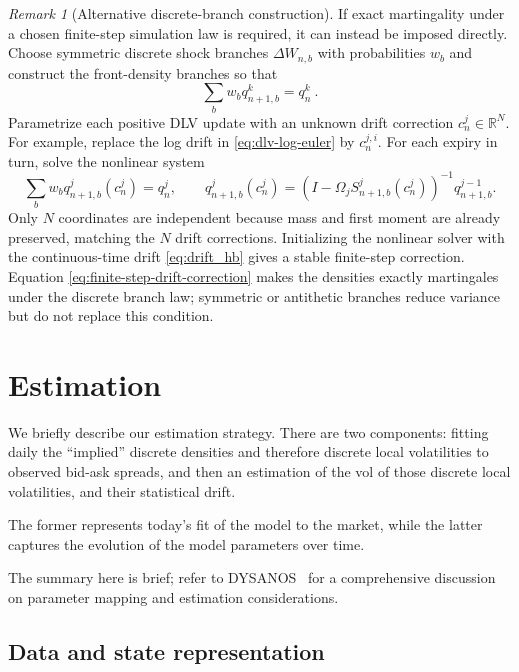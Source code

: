 \documentclass[11pt]{article}
\theoremstyle{plain}
\theoremstyle{definition}
\theoremstyle{remark}
\newtheorem{remark}[theorem]{Remark}
\begin{document}
\begin{remark}[Alternative discrete-branch construction]
  \label{rem:discrete-branch-sampling}
  If exact martingality under a chosen finite-step simulation law is required,
  it can instead be imposed directly. Choose symmetric discrete shock branches
  $\Delta W_{n,b}$ with probabilities $w_b$ and construct the front-density
  branches so that
  \[
    \sum_b w_bq_{n+1,b}^k=q_n^k \ .
  \]
  Parametrize each positive DLV update with an unknown drift correction
  $c_n^j\in\mathbb R^N$. For example, replace the log drift in
  \eqref{eq:dlv-log-euler} by $c_n^{j,i}$. For each expiry in turn, solve the
  nonlinear system
  \begin{equation}
    \label{eq:finite-step-drift-correction}
    \sum_b w_b q_{n+1,b}^j(c_n^j)=q_n^j,
    \qquad
    q_{n+1,b}^j(c_n^j)
      =\left(I-\Omega_jS_{n+1,b}^j(c_n^j)\right)^{-1}
        q_{n+1,b}^{j-1}.
  \end{equation}
  Only $N$ coordinates are independent because mass and first moment are
  already preserved, matching the $N$ drift corrections. Initializing the
  nonlinear solver with the continuous-time drift
  \eqref{eq:drift_hb} gives
  a stable finite-step correction. Equation
  \eqref{eq:finite-step-drift-correction} makes the densities exactly
  martingales under the discrete branch law; symmetric or antithetic branches
  reduce variance but do not replace this condition.

\end{remark}

\section{Estimation}\label{sec:estimation}

We briefly describe our estimation strategy. There are two components: fitting daily the ``implied'' discrete densities and therefore discrete local volatilities
to observed bid-ask spreads, and then an estimation of the vol of those discrete local volatilities, and their statistical drift.

The former represents today's fit of the model to the market, while the latter captures the evolution of the model parameters over time.

The summary here is brief; refer
to DYSANOS~\citep{DYSANOS2026} for a comprehensive discussion on parameter mapping and estimation considerations.

\subsection{Data and state representation}
\label{sec:estimation-data}
\end{document}
